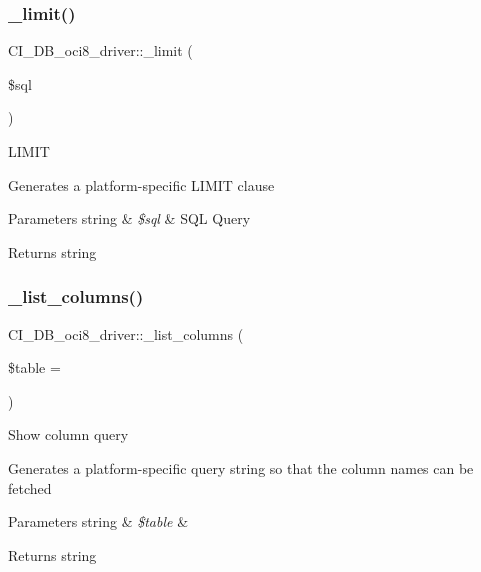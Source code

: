 \subsubsection{\texorpdfstring{\+\_\+limit()}{\_limit()}}
{\footnotesize\ttfamily C\+I\+\_\+\+D\+B\+\_\+oci8\+\_\+driver\+::\+\_\+limit (\begin{DoxyParamCaption}\item[{}]{\$sql }\end{DoxyParamCaption})\hspace{0.3cm}{\ttfamily [protected]}}

L\+I\+M\+IT

Generates a platform-\/specific L\+I\+M\+IT clause


\begin{DoxyParams}[1]{Parameters}
string & {\em \$sql} & S\+QL Query \\
\hline
\end{DoxyParams}
\begin{DoxyReturn}{Returns}
string 
\end{DoxyReturn}
\mbox{\label{class_c_i___d_b__oci8__driver_a52b8f333a8f3811ed2ed1011174160d0}} 
\subsubsection{\texorpdfstring{\+\_\+list\+\_\+columns()}{\_list\_columns()}}
{\footnotesize\ttfamily C\+I\+\_\+\+D\+B\+\_\+oci8\+\_\+driver\+::\+\_\+list\+\_\+columns (\begin{DoxyParamCaption}\item[{}]{\$table = {\ttfamily \textquotesingle{}\textquotesingle{}} }\end{DoxyParamCaption})\hspace{0.3cm}{\ttfamily [protected]}}

Show column query

Generates a platform-\/specific query string so that the column names can be fetched


\begin{DoxyParams}[1]{Parameters}
string & {\em \$table} & \\
\hline
\end{DoxyParams}
\begin{DoxyReturn}{Returns}
string 
\end{DoxyReturn}
\mbox{\label{class_c_i___d_b__oci8__driver_a8736321498ba731f7fe0624c927362ad}} 
